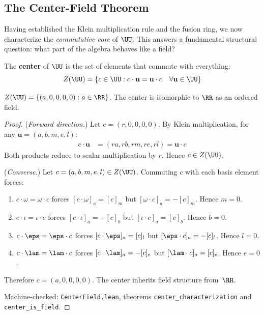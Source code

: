 
\subsection{The Center-Field Theorem}\label{sec:center-field}

Having established the Klein multiplication rule and the fusion ring, we now characterize the \emph{commutative core} of $\UU$. This answers a fundamental structural question: what part of the algebra behaves like a field?

\begin{definition}[Center of $\UU$]\label{def:center}
The \textbf{center} of $\UU$ is the set of elements that commute with everything:
$$Z(\UU) = \{c \in \UU : c \cdot \mathbf{u} = \mathbf{u} \cdot c \quad \forall \mathbf{u} \in \UU\}$$
\end{definition}

\begin{theorem}{\label{thm:center-field}}
$Z(\UU) = \{(a, 0, 0, 0, 0) : a \in \RR\}$. The center is isomorphic to $\RR$ as an ordered field.
\end{theorem}

\begin{proof}
(\emph{Forward direction.}) Let $c = (r, 0, 0, 0, 0)$. By Klein multiplication, for any $\mathbf{u} = (a, b, m, e, l)$:
\begin{align*}
c \cdot \mathbf{u} &= (ra, rb, rm, re, rl) = \mathbf{u} \cdot c
\end{align*}
Both products reduce to scalar multiplication by $r$. Hence $c \in Z(\UU)$.

(\emph{Converse.}) Let $c = (a, b, m, e, l) \in Z(\UU)$. Commuting $c$ with each basis element forces:
\begin{enumerate}
\item $c \cdot \omega = \omega \cdot c$ forces $[c \cdot \omega]_a = [c]_m$ but $[\omega \cdot c]_a = -[c]_m$. Hence $m = 0$.
\item $c \cdot \iota = \iota \cdot c$ forces $[c \cdot \iota]_a = -[c]_b$ but $[\iota \cdot c]_a = [c]_b$. Hence $b = 0$.
\item $c \cdot \eps = \eps \cdot c$ forces $[c \cdot \eps]_a = [c]_l$ but $[\eps \cdot c]_a = -[c]_l$. Hence $l = 0$.
\item $c \cdot \lam = \lam \cdot c$ forces $[c \cdot \lam]_a = -[c]_e$ but $[\lam \cdot c]_a = [c]_e$. Hence $e = 0$.
\end{enumerate}
Therefore $c = (a, 0, 0, 0, 0)$. The center inherits field structure from~$\RR$.

Machine-checked: \texttt{CenterField.lean}, theorems \texttt{center\_characterization} and \texttt{center\_is\_field}. \qedhere
\end{proof}


